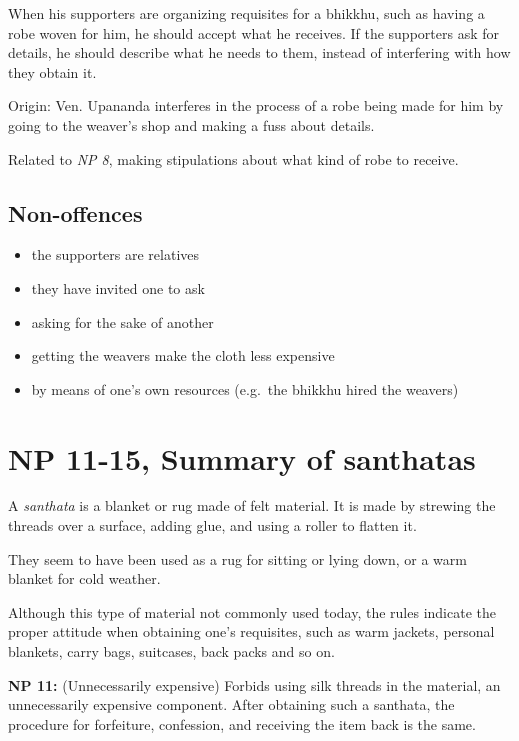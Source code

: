 When his supporters are organizing requisites for a bhikkhu, such as
having a robe woven for him, he should accept what he receives. If the
supporters ask for details, he should describe what he needs to them,
instead of interfering with how they obtain it.

Origin: Ven. Upananda interferes in the process of a robe being made for
him by going to the weaver's shop and making a fuss about details.

Related to \emph{NP 8}, making stipulations about what kind of robe to
receive.

\subsection{Non-offences}

\begin{itemize}
\tightlist
\item
  the supporters are relatives
\item
  they have invited one to ask
\item
  asking for the sake of another
\item
  getting the weavers make the cloth less expensive
\item
  by means of one's own resources (e.g.~the bhikkhu hired the weavers)
\end{itemize}

\clearpage

\section{NP 11-15, Summary of santhatas}

A \emph{santhata} is a blanket or rug made of felt material. It is made
by strewing the threads over a surface, adding glue, and using a roller
to flatten it.

They seem to have been used as a rug for sitting or lying down, or a
warm blanket for cold weather.

Although this type of material not commonly used today, the rules
indicate the proper attitude when obtaining one's requisites, such as
warm jackets, personal blankets, carry bags, suitcases, back packs and
so on.

\textbf{NP 11:} (Unnecessarily expensive) Forbids using silk threads in
the material, an unnecessarily expensive component. After obtaining such
a santhata, the procedure for forfeiture, confession, and receiving the
item back is the same.

